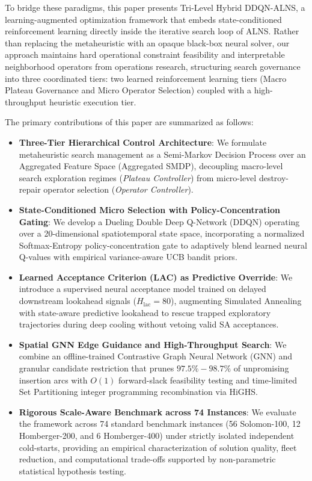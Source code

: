 \documentclass{ieeeaccess}
\begin{document}
To bridge these paradigms, this paper presents Tri-Level Hybrid DDQN-ALNS, a learning-augmented optimization framework that embeds state-conditioned reinforcement learning directly inside the iterative search loop of ALNS. Rather than replacing the metaheuristic with an opaque black-box neural solver, our approach maintains hard operational constraint feasibility and interpretable neighborhood operators from operations research, structuring search governance into three coordinated tiers: two learned reinforcement learning tiers (Macro Plateau Governance and Micro Operator Selection) coupled with a high-throughput heuristic execution tier. 

The primary contributions of this paper are summarized as follows:
\begin{itemize}
    \item \textbf{Three-Tier Hierarchical Control Architecture}: We formulate metaheuristic search management as a Semi-Markov Decision Process over an Aggregated Feature Space (Aggregated SMDP), decoupling macro-level search exploration regimes (\emph{Plateau Controller}) from micro-level destroy-repair operator selection (\emph{Operator Controller}).
    \item \textbf{State-Conditioned Micro Selection with Policy-Concentration Gating}: We develop a Dueling Double Deep Q-Network (DDQN) operating over a 20-dimensional spatiotemporal state space, incorporating a normalized Softmax-Entropy policy-concentration gate to adaptively blend learned neural Q-values with empirical variance-aware UCB bandit priors.
    \item \textbf{Learned Acceptance Criterion (LAC) as Predictive Override}: We introduce a supervised neural acceptance model trained on delayed downstream lookahead signals ($H_{\text{lac}}=80$), augmenting Simulated Annealing with state-aware predictive lookahead to rescue trapped exploratory trajectories during deep cooling without vetoing valid SA acceptances.
    \item \textbf{Spatial GNN Edge Guidance and High-Throughput Search}: We combine an offline-trained Contrastive Graph Neural Network (GNN) and granular candidate restriction that prunes $97.5\%-98.7\%$ of unpromising insertion arcs with $O(1)$ forward-slack feasibility testing and time-limited Set Partitioning integer programming recombination via HiGHS.
    \item \textbf{Rigorous Scale-Aware Benchmark across 74 Instances}: We evaluate the framework across 74 standard benchmark instances (56 Solomon-100, 12 Homberger-200, and 6 Homberger-400) under strictly isolated independent cold-starts, providing an empirical characterization of solution quality, fleet reduction, and computational trade-offs supported by non-parametric statistical hypothesis testing.
\end{itemize}
\end{document}
